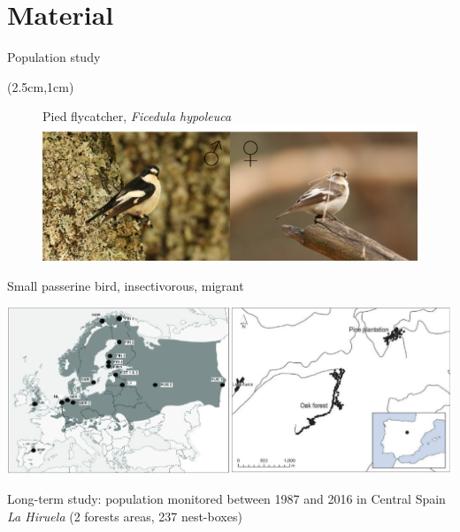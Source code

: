 \documentclass[compress]{beamer}
\begin{document}
\section{Material}
\begin{frame}{Population study}

\begin{textblock*}{9cm}(2.5cm,1cm)
\begin{figure}
 \small Pied flycatcher, \textit{Ficedula hypoleuca}
\includegraphics[width = 5 cm]{flycatcher2.png} 
\end{figure}
\end{textblock*}

\vspace{2.5cm}
Small passerine bird, insectivorous, migrant

\begin{center}
 \includegraphics[height = 3.5 cm]{Image/Illustration/map1.png} 
    \end{center}

Long-term study: population monitored between 1987 and 2016 in Central Spain \textit{La Hiruela} (2 forests areas, 237 nest-boxes)

\end{frame}
\end{document}
